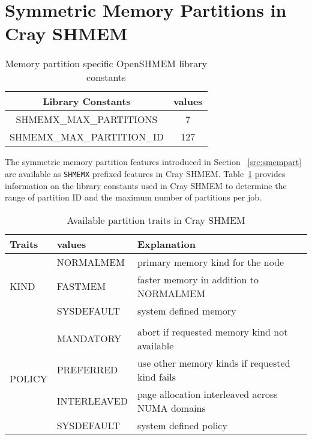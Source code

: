 \section{Symmetric Memory Partitions in Cray SHMEM}
\label{src:implement}
\begin{table}[h!]
\centering
\vspace{-20pt}
\begin{tabular}{|c c|}\hline
    Library Constants & values \\[0.5ex]
    \hline\hline
    SHMEMX\_MAX\_PARTITIONS & 7 \\
    SHMEMX\_MAX\_PARTITION\_ID & 127 \\
    \hline
\end{tabular}
\caption{Memory partition specific OpenSHMEM library constants}
\label{tab:const}
\end{table}
\vspace{-20pt}

The symmetric memory partition features introduced in Section
~\ref{src:smempart} are available as \texttt{SHMEMX} prefixed
features in Cray SHMEM. Table~\ref{tab:const} provides information
on the library constants used in Cray SHMEM to determine the
range of partition ID and the maximum number of partitions per job.

\begin{table}[h!]
\centering
\vspace{-20pt}
\begin{tabular}{|l l l|}\hline
    Traits & values & Explanation\\[0.5ex]
    \hline\hline
    \multirow{3}{4em}{KIND} & NORMALMEM  & primary memory kind for
                                           the node \\
                            & FASTMEM    & faster memory in addition
                                           to NORMALMEM \\
                            & SYSDEFAULT & system defined memory \\
                            &&\\
    \multirow{4}{4em}{POLICY} & MANDATORY   & abort if requested memory
                                              kind not available \\
                              & PREFERRED   & use other memory kinds if
                                              requested kind fails \\
                              & INTERLEAVED & page allocation interleaved
                                              across NUMA domains \\
                              & SYSDEFAULT  & system defined policy \\
    \hline
\end{tabular}
\caption{Available partition traits in Cray SHMEM}
\label{tab:trait}
\end{table}
\vspace{-20pt}

